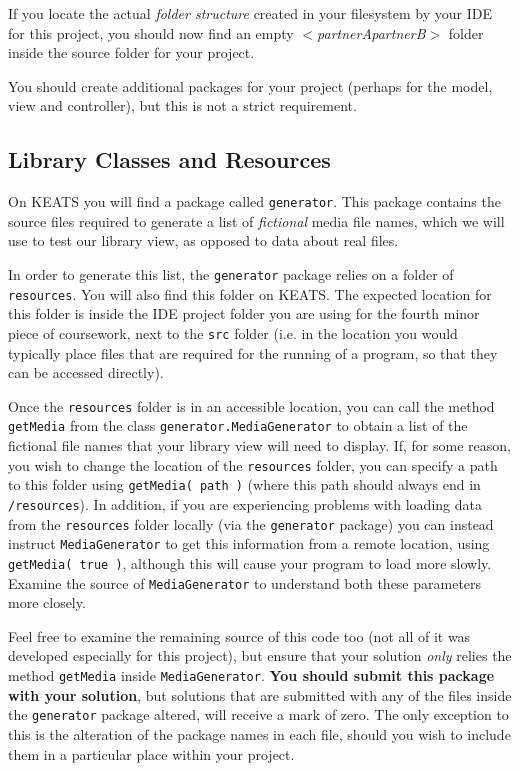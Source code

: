 \documentclass[11pt]{article}
\begin{document}
If you locate the actual \emph{folder structure} created in your filesystem by your IDE for this project, you should now find an empty $<$\emph{partnerApartnerB}$>$ folder inside the source folder for your project. 

You should create additional packages for your project (perhaps for the model, view and controller), but this is not a strict requirement.

\subsection{Library Classes and Resources}

On KEATS you will find a package called \texttt{generator}. This package contains the source files required to generate a list of \emph{fictional} media file names, which we will use to test our library view, as opposed to data about real files. 

In order to generate this list, the \texttt{generator} package relies on a folder of \texttt{resources}. You will also find this folder on KEATS. The expected location for this folder is inside the IDE project folder you are using for the fourth minor piece of coursework, next to the \texttt{src} folder (i.e. in the location you would typically place files that are required for the running of a program, so that they can be accessed directly). 

Once the \texttt{resources} folder is in an accessible location, you can call the method \texttt{getMedia} from the class \texttt{generator.MediaGenerator} to obtain a list of the fictional file names that your library view will need to display. If, for some reason, you wish to change the location of the \texttt{resources} folder, you can specify a path to this folder using \texttt{getMedia( path )} (where this path should always end in \texttt{/resources}). In addition, if you are experiencing problems with loading data from the \texttt{resources} folder locally (via the \texttt{generator} package) you can instead instruct \texttt{MediaGenerator} to get this information from a remote location, using  \texttt{getMedia( true )}, although this will cause your program to load more slowly. Examine the source of \texttt{MediaGenerator} to understand both these parameters more closely.

Feel free to examine the remaining source of this code too (not all of it was developed especially for this project), but ensure that your solution \emph{only} relies the method \texttt{getMedia} inside \texttt{MediaGenerator}. \textbf{You should submit this package with your solution}, but solutions that are submitted with any of the files inside the \texttt{generator} package altered, will receive a mark of zero. The only exception to this is the alteration of the package names in each file, should you wish to include them in a particular place within your project.
\end{document}
